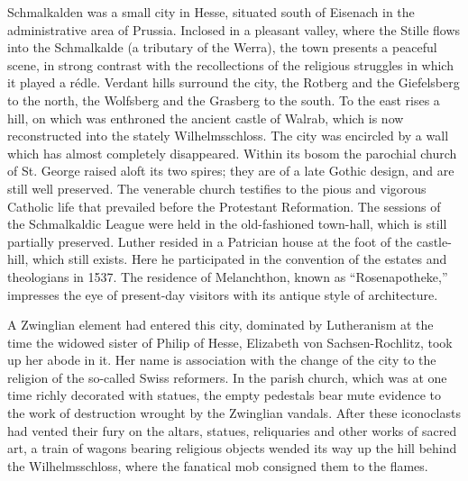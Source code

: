 Schmalkalden was a small city in Hesse, situated south of Eisenach
in the administrative area of Prussia. Inclosed in a pleasant valley,
where the Stille flows into the Schmalkalde (a tributary of the
Werra), the town presents a peaceful scene, in strong contrast with
the recollections of the religious struggles in which it played a rédle.
Verdant hills surround the city, the Rotberg and the Giefelsberg to
the north, the Wolfsberg and the Grasberg to the south. To the east
rises a hill, on which was enthroned the ancient castle of Walrab,
which is now reconstructed into the stately Wilhelmsschloss. The city
was encircled by a wall which has almost completely disappeared.
Within its bosom the parochial church of St. George raised aloft its
two spires; they are of a late Gothic design, and are still well preserved.
The venerable church testifies to the pious and vigorous
Catholic life that prevailed before the Protestant Reformation. The
sessions of the Schmalkaldic League were held in the old-fashioned
town-hall, which is still partially preserved. Luther resided in a Patrician
house at the foot of the castle-hill, which still exists. Here he
participated in the convention of the estates and theologians in 1537.
The residence of Melanchthon, known as “Rosenapotheke,” impresses
the eye of present-day visitors with its antique style of architecture.

A Zwinglian element had entered this city, dominated by Lutheranism at
the time the widowed sister of Philip of Hesse, Elizabeth von
Sachsen-Rochlitz, took up her abode in it. Her name is association
with the change of the city to the religion of the so-called Swiss
reformers. In the parish church, which was at one time richly decorated
with statues, the empty pedestals bear mute evidence to the work of
destruction wrought by the Zwinglian vandals. After these iconoclasts
had vented their fury on the altars, statues, reliquaries and
other works of sacred art, a train of wagons bearing religious objects
wended its way up the hill behind the Wilhelmsschloss, where
the fanatical mob consigned them to the flames.
